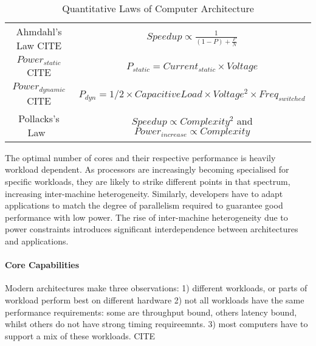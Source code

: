 \begin{table*}
\begin{center}
\label{table:quantlaws}
\caption{Quantitative Laws of Computer Architecture}
\begin{tabular}{|c|c|}
Ahmdahl's Law CITE & $ Speedup \propto \frac{1}{(1 - P) + \frac{P}{N}} $\\ 
$Power_{static}$ CITE & $P_{static} = Current_{static} \times Voltage$ \\
$Power_{dynamic}$ CITE & $P_{dyn} = 1/2 \times Capacitive Load  \times Voltage^{2} \times Freq_{switched}$\\
Pollacks's Law~\cite{borkar2011future}& $ Speedup \propto Complexity^{2}$ and  $Power_{increase} \propto Complexity$\\
\end{tabular}
\end{center}

\end{table*}

The optimal number of cores and their respective 
performance is heavily workload dependent. As processors 
are increasingly becoming specialised for specific workloads,
they are likely to strike different points in that spectrum, 
increasing inter-machine heterogeneity. Similarly,
developers have to adapt applications to match 
the degree of parallelism required to guarantee good performance
with low power. The rise of inter-machine heterogeneity
due to power constraints introduces significant interdependence
between architectures and applications. 

\paragraph{Core Capabilities}
Modern architectures make three observations: 1) different workloads,
or parts of workload perform best on different hardware 2) not all
workloads have the same performance requirements: some are throughput
bound, others latency bound, whilst others do not have strong timing requireemnts.
3) most computers have to support a mix of these workloads.  CITE

